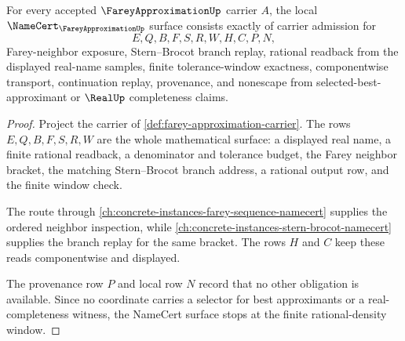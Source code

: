 \begin{theorem}
\label{thm:farey-approximation-namecert-obligations}
For every accepted $\FareyApproximationUp$ carrier $A$, the local $\NameCert_{\FareyApproximationUp}$ surface consists exactly of carrier admission for
$$
E,Q,B,F,S,R,W,H,C,P,N,
$$
Farey-neighbor exposure, Stern--Brocot branch replay, rational readback from the displayed real-name samples, finite tolerance-window exactness, componentwise transport, continuation replay, provenance, and nonescape from selected-best-approximant or $\RealUp$ completeness claims.
\end{theorem}
\begin{proof}
Project the carrier of \autoref{def:farey-approximation-carrier}. The rows $E,Q,B,F,S,R,W$ are the whole mathematical surface: a displayed real name, a finite rational readback, a denominator and tolerance budget, the Farey neighbor bracket, the matching Stern--Brocot branch address, a rational output row, and the finite window check.

The route through \autoref{ch:concrete-instances-farey-sequence-namecert} supplies the ordered neighbor inspection, while \autoref{ch:concrete-instances-stern-brocot-namecert} supplies the branch replay for the same bracket. The rows $H$ and $C$ keep these reads componentwise and displayed.

The provenance row $P$ and local row $N$ record that no other obligation is available. Since no coordinate carries a selector for best approximants or a real-completeness witness, the NameCert surface stops at the finite rational-density window.
\end{proof}


